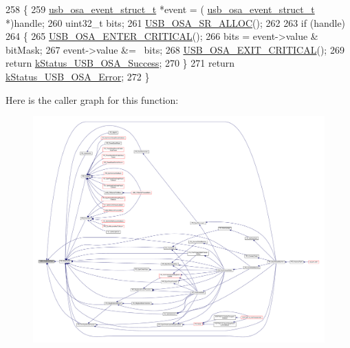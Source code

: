 \begin{DoxyCode}
258 \{
259     \hyperlink{struct__usb__osa__event__struct}{usb\_osa\_event\_struct\_t} *\textcolor{keyword}{event} = (
      \hyperlink{struct__usb__osa__event__struct}{usb\_osa\_event\_struct\_t} *)handle;
260     uint32\_t bits;
261     \hyperlink{usb__osa__bm_8h_a8dbccf46cc2f8e3b5cece6a4a84f7ae8}{USB\_OSA\_SR\_ALLOC}();
262 
263     \textcolor{keywordflow}{if} (handle)
264     \{
265         \hyperlink{usb__osa__bm_8h_a0485f70bf9c9a22f0340f014bc567362}{USB\_OSA\_ENTER\_CRITICAL}();
266         bits = \textcolor{keyword}{event}->value & bitMask;
267         \textcolor{keyword}{event}->value &= ~bits;
268         \hyperlink{usb__osa__bm_8h_a5b8053eca19b6df666a26fad3b07f953}{USB\_OSA\_EXIT\_CRITICAL}();
269         \textcolor{keywordflow}{return} \hyperlink{group__usb__os__abstraction_gga453ebd2f93aafb8c938c3a23c815f9bdab90805fb75297fda1ca60dbb2283f933}{kStatus\_USB\_OSA\_Success};
270     \}
271     \textcolor{keywordflow}{return} \hyperlink{group__usb__os__abstraction_gga453ebd2f93aafb8c938c3a23c815f9bda40b794ea06e27b8ec1d67538f12eb350}{kStatus\_USB\_OSA\_Error};
272 \}
\end{DoxyCode}


Here is the caller graph for this function\-:
\nopagebreak
\begin{figure}[H]
\begin{center}
\leavevmode
\includegraphics[width=350pt]{group__usb__os__abstraction_ga90357f04d40469dc07104033b3c8581c_icgraph}
\end{center}
\end{figure}


